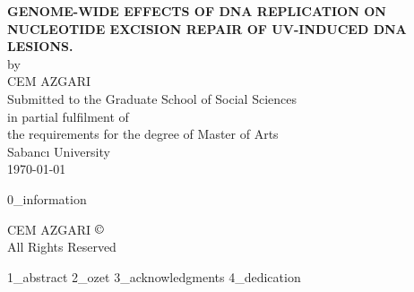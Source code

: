\documentclass[12pt, leqno, oneside, a4paper]{book}
\begin{document}
 
\sloppy


\thispagestyle{empty} 
\onehalfspacing
\begin{center}
\MakeUppercase{\bfseries GENOME-WIDE EFFECTS OF DNA REPLICATION ON
NUCLEOTIDE EXCISION REPAIR OF UV-INDUCED
DNA LESIONS.} \\[7\baselineskip]

by \\
\MakeUppercase{Cem Azgari} \\[7\baselineskip]

Submitted to the Graduate School of Social Sciences \\
in partial fulfilment of \\
the requirements for the degree of Master of Arts \\[7\baselineskip]

Sabancı University \\
\Cemdateformat\today
\end{center}


\clearpage\pagebreak
{0_information}


\clearpage\pagebreak
\thispagestyle{empty} 
\null\vfill
\begin{centering}
CEM AZGARI \the\year\space $\copyright$ \\[\baselineskip]
All Rights Reserved \\
\end{centering} 


{1_abstract}
{2_ozet}
{3_acknowledgments}
{4_dedication}

\clearpage
\tableofcontents

\clearpage
{}
{\let\oldnumberline\numberline\renewcommand{\numberline}{\tablename~\oldnumberline}\listoftables}

\clearpage
{}
{\let\oldnumberline\numberline\renewcommand{\numberline}{\figurename~\oldnumberline}\listoffigures}

\clearpage\pagebreak
\printnoidxglossary[title=\textbf{LIST OF ABBREVIATONS}]
\end{document}
